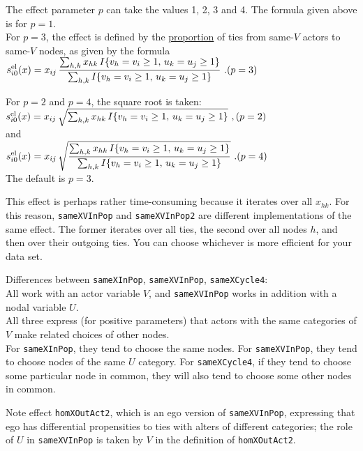 \documentclass[a4paper,fleqn,11pt]{article}
\newcommand{\+}{\, + \,}
\newcommand{\vit}{\theenumi}
\newcounter{savenumi}
\begin{document}
\begin{enumerate}
 The effect parameter $p$ can take the values 1, 2, 3 and 4.
 The formula given above is for $p=1$.\\
 For $p=3$, the effect is defined by the \underline{proportion} of ties from same-$V$ actors
 to same-$V$ nodes, as given by the formula \\[0.5em]
 $\displaystyle s^{\rm el}_{i\vit}(x) =  x_{ij}\, \frac{ \sum_{h,k} x_{hk}\, I\{v_h = v_i \geq 1,\, u_k=u_j \geq 1\}}
            { \sum_{h,k} I\{v_h = v_i \geq 1,\, u_k=u_j \geq 1\}} \ . \hfill (p=3) $

 For $p=2$ and $p=4$, the square root is taken: \\[0.5em]
 $s^{\rm el}_{i\vit}(x) =  x_{ij}\, \sqrt{\sum_{h,k} x_{hk}\, I\{v_h = v_i \geq 1,\, u_k=u_j \geq 1 \}} \ ,
                 \hfill (p=2)$\\[0.3em]
 and \\[0.3em]
 $\displaystyle s^{\rm el}_{i\vit}(x) =  x_{ij}\, \sqrt{ \frac{ \sum_{h,k} x_{hk}\, I\{v_h = v_i \geq 1,\, u_k=u_j \geq 1 \}}
            { \sum_{h,k} I\{v_h = v_i \geq 1,\, u_k=u_j \geq 1 \}}}  \ . \hfill (p=4)$\\[0.3em]

The default is $p=3$.

This effect is perhaps rather time-consuming because it iterates over all $x_{hk}$.
For this reason, \texttt{sameXVInPop} and \texttt{sameXVInPop2} are different implementations
of the same effect.
The former iterates over all ties, the second over all nodes $h$, and then over their outgoing ties.
You can choose whichever is more efficient for your data set.


Differences between \texttt{sameXInPop}, \texttt{sameXVInPop}, \texttt{sameXCycle4}:\\
All work with an actor variable $V$, and \texttt{sameXVInPop} works in addition
with a nodal variable $U$.\\
All three express (for positive parameters) that actors with the same categories of $V$
make related choices of other nodes.\\
For \texttt{sameXInPop}, they tend to choose the same nodes.
For \texttt{sameXVInPop}, they tend to choose nodes of the same $U$ category.
For \texttt{sameXCycle4}, if they tend to choose some particular node in common,
they will also tend to choose some other nodes in common.

Note effect \texttt{homXOutAct2}, which is an ego version of  \texttt{sameXVInPop},
expressing that ego has differential propensities to ties with alters
of different categories; the role of $U$ in \texttt{sameXVInPop}
is taken by $V$ in the definition of \texttt{homXOutAct2}.


\setcounter{savenumi}{\value{enumi}}
\end{enumerate}
\end{document}
